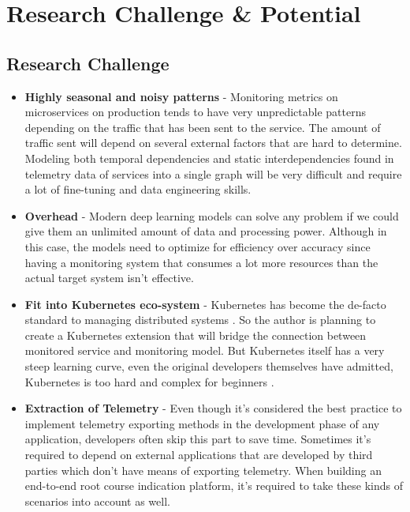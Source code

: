 \section{Research Challenge \& Potential}


\subsection{Research Challenge}

\begin{itemize}[leftmargin=*] 
    \item \textbf{Highly seasonal and noisy patterns} - Monitoring metrics on microservices on production tends to have very unpredictable patterns depending on the traffic that has been sent to the service. The amount of traffic sent will depend on several external factors that are hard to determine. Modeling both temporal dependencies and static interdependencies found in telemetry data of services into a single graph will be very difficult and require a lot of fine-tuning and data engineering skills.
    \item \textbf{Overhead} - Modern deep learning models can solve any problem if we could give them an unlimited amount of data and processing power. Although in this case, the models need to optimize for efficiency over accuracy since having a monitoring system that consumes a lot more resources than the actual target system isn't effective.
    \item \textbf{Fit into Kubernetes eco-system} - Kubernetes has become the de-facto standard to managing distributed systems \citep{WhatisCo78:online}. So the author is planning to create a Kubernetes extension that will bridge the connection between monitored service and monitoring model. But Kubernetes itself has a very steep learning curve, even the original developers themselves have admitted, Kubernetes is too hard and complex for beginners \citep{Googlead4:online}.
    \item \textbf{Extraction of Telemetry} - Even though it's considered the best practice to implement telemetry exporting methods in the development phase of any application, developers often skip this part to save time. Sometimes it's required to depend on external applications that are developed by third parties which don't have means of exporting telemetry. When building an end-to-end root course indication platform, it's required to take these kinds of scenarios into account as well.
\end{itemize}

